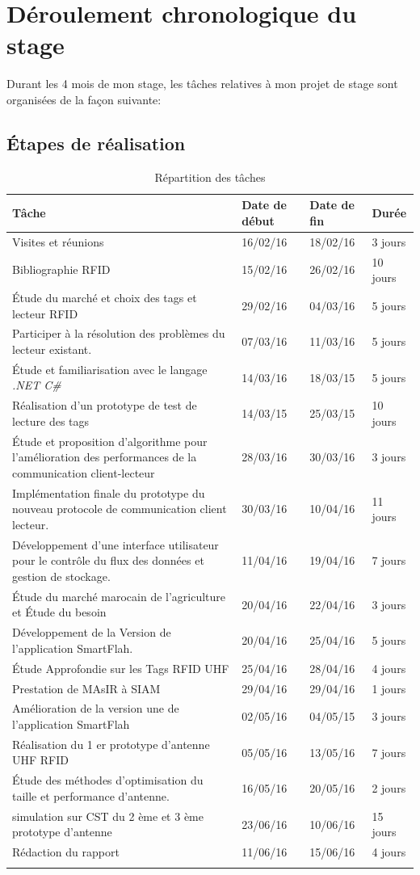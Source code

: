 \documentclass[11pt, a4paper, twoside]{book}
\begin{document}
\section{Déroulement chronologique du stage}
Durant les 4 mois de mon stage, les tâches relatives à mon projet de stage sont organisées de la façon suivante:
\subsection{Étapes	de	réalisation}
\begin{longtable}{|p{}|p{}|p{}| p{}|}
\hline
\textbf{Tâche} & \textbf{Date de début} & \textbf{Date de fin} & \textbf{Durée} \\
\hline
Visites et réunions & 16/02/16 & 18/02/16 & 3 jours \\
\hline
Bibliographie RFID & 15/02/16 & 26/02/16 & 10 jours \\
\hline
Étude du marché et choix des tags et lecteur RFID & 29/02/16 & 04/03/16 & 5 jours \\
\hline
Participer à  la résolution des problèmes du lecteur existant.
 & 07/03/16 & 11/03/16 & 5 jours \\
\hline
Étude et familiarisation avec le langage \emph{.NET C\#} & 14/03/16 & 18/03/15 & 5 jours \\
\hline
Réalisation d'un prototype de test de lecture des tags & 14/03/15 & 25/03/15 & 10 jours \\
\hline
 Étude et proposition d'algorithme pour l'amélioration des performances de la communication client-lecteur
 & 28/03/16 & 30/03/16 & 3 jours \\
\hline
Implémentation finale du prototype du nouveau protocole de communication client lecteur.
 & 30/03/16 & 10/04/16 & 11 jours \\
\hline
Développement d'une interface utilisateur pour le contrôle du flux des données et gestion de stockage.
 & 11/04/16 & 19/04/16 & 7 jours \\
\hline
Étude du marché marocain de l'agriculture et Étude du besoin & 20/04/16 & 22/04/16 & 3 jours \\
\hline
Développement de la Version de l'application SmartFlah. & 20/04/16 & 25/04/16 & 5 jours \\
\hline
Étude Approfondie sur les Tags RFID UHF  & 25/04/16 & 28/04/16 & 4 jours \\
\hline
Prestation de MAsIR à SIAM  & 29/04/16 & 29/04/16 & 1 jours \\
\hline
Amélioration de la version une de l'application SmartFlah & 02/05/16 & 04/05/15 & 3 jours \\
\hline
Réalisation du 1 er prototype d'antenne UHF RFID & 05/05/16 & 13/05/16 & 7 jours \\
\hline
Étude des méthodes d'optimisation du taille et performance d'antenne. & 16/05/16 & 20/05/16 & 2 jours \\
\hline
simulation sur CST du 2 ème et 3 ème prototype d'antenne & 23/06/16 & 10/06/16 & 15 jours \\
\hline
Rédaction du rapport & 11/06/16 & 15/06/16 & 4 jours \\
\hline
\caption{Répartition des tâches}
\end{longtable}
\end{document}
